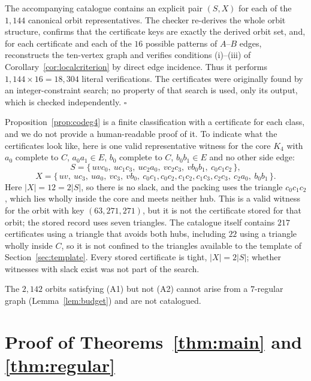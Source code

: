 \documentclass[11pt,a4paper]{amsart}
\theoremstyle{plain}
\theoremstyle{definition}
\begin{document}
The accompanying catalogue contains an explicit pair $(S,X)$ for each of the
$1{,}144$ canonical orbit representatives. The checker re-derives the whole
orbit structure, confirms that the certificate keys are exactly the derived
orbit set, and, for each certificate and each of the $16$ possible patterns of
$A$--$B$ edges, reconstructs the ten-vertex graph and verifies conditions
(i)--(iii) of Corollary~\ref{cor:localcriterion} by direct edge incidence.
Thus it performs $1{,}144\times16=18{,}304$ literal verifications. The
certificates were originally found by an integer-constraint search; no
property of that search is used, only its output, which is checked
independently. \hfill$\square$

Proposition~\ref{prop:codeg4} is a finite classification with a certificate
for each class, and we do not provide a human-readable proof of it. To indicate
what the certificates look like, here is one valid representative witness for the core $K_4$
with $a_0$ complete to $C$, $a_0a_1\in E$, $b_0$ complete to $C$,
$b_0b_1\in E$ and no other side edge:
\[
  S=\{\,uvc_0,\ uc_1c_3,\ uc_2a_0,\ vc_2c_3,\ vb_0b_1,\ c_0c_1c_2\,\},
\]
\[
  X=\{\,uv,\ uc_3,\ ua_0,\ vc_3,\ vb_0,\
        c_0c_1,c_0c_2,c_1c_2,c_1c_3,c_2c_3,\ c_2a_0,\ b_0b_1\,\}.
\]
Here $|X|=12=2|S|$, so there is no slack, and the packing uses the triangle
$c_0c_1c_2$, which lies wholly inside the core and meets neither hub. This is
a valid witness for the orbit with key $(63,271,271)$, but it is not the
certificate stored for that orbit; the stored record uses seven triangles.
The catalogue itself contains $217$ certificates using a triangle that avoids
both hubs, including $22$ using a triangle wholly inside $C$, so it is not
confined to the triangles available to the template of
Section~\ref{sec:template}. Every stored certificate is tight,
$|X|=2|S|$; whether witnesses with slack exist was not part of the search.

The $2{,}142$ orbits satisfying (A1) but not (A2) cannot arise from a
$7$-regular graph (Lemma~\ref{lem:budget}) and are not catalogued.

\section{Proof of Theorems~\ref{thm:main} and \ref{thm:regular}}
\label{sec:proof}
\end{document}
